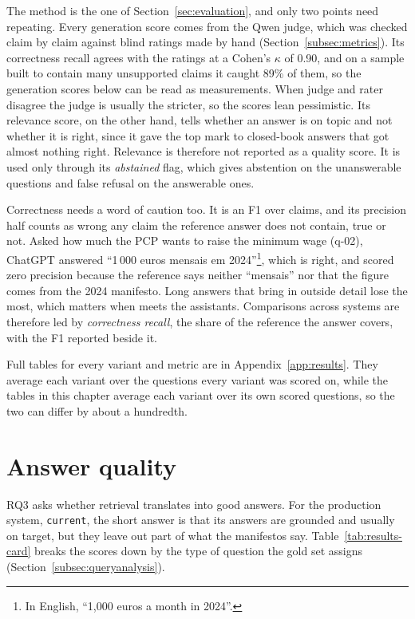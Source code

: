 The method is the one of Section~\ref{sec:evaluation}, and only two points
need repeating. Every generation score comes from the Qwen judge, which was
checked claim by claim against blind ratings made by hand
(Section~\ref{subsec:metrics}). Its correctness recall agrees with the ratings
at a Cohen's $\kappa$ of 0.90, and on a sample built to contain many
unsupported claims it caught 89\% of them, so the generation scores below can be read as
measurements. When judge and rater disagree the judge is usually the stricter,
so the scores lean pessimistic. Its relevance score, on the other hand, tells
whether an answer is on topic and not whether it is right, since it gave the
top mark to closed-book answers that got almost nothing right. Relevance is
therefore not reported as a quality score. It is used only through its
\emph{abstained} flag, which gives abstention on the unanswerable questions
and false refusal on the answerable ones.

Correctness needs a word of caution too. It is an F1 over claims, and its
precision half counts as wrong any claim the reference answer does not
contain, true or not. Asked how much the PCP wants to raise the minimum wage
(q-02), ChatGPT answered ``1\,000 euros mensais em 2024''\footnote{In English, ``1,000
euros a month in 2024''.}, which is right, and scored zero precision because
the reference says neither ``mensais'' nor that the figure comes from the 2024
manifesto. Long answers that bring in outside detail lose the most, which
matters when \sysname{} meets the assistants. Comparisons across systems are
therefore led by \emph{correctness recall}, the share of the reference the
answer covers, with the F1 reported beside it.

Full tables for every variant and metric are in Appendix~\ref{app:results}.
They average each variant over the questions every variant was scored on,
while the tables in this chapter average each variant over its own scored
questions, so the two can differ by about a hundredth.

\section{Answer quality} \label{sec:results-quality}

RQ3 asks whether retrieval translates into good answers. For the production
system, \texttt{current}, the short answer is that its answers are grounded
and usually on target, but they leave out part of what the manifestos say.
Table~\ref{tab:results-card} breaks the scores down by the type of question
the gold set assigns (Section~\ref{subsec:queryanalysis}).

